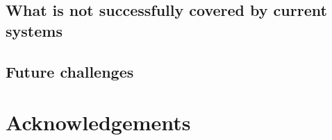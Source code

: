 \documentclass[a4paper]{article}
\begin{document}
\subsection{What is not successfully covered by current systems}

\subsection{Future challenges}
\label{sect|future-challenges}

\section*{Acknowledgements} 




\end{document}
